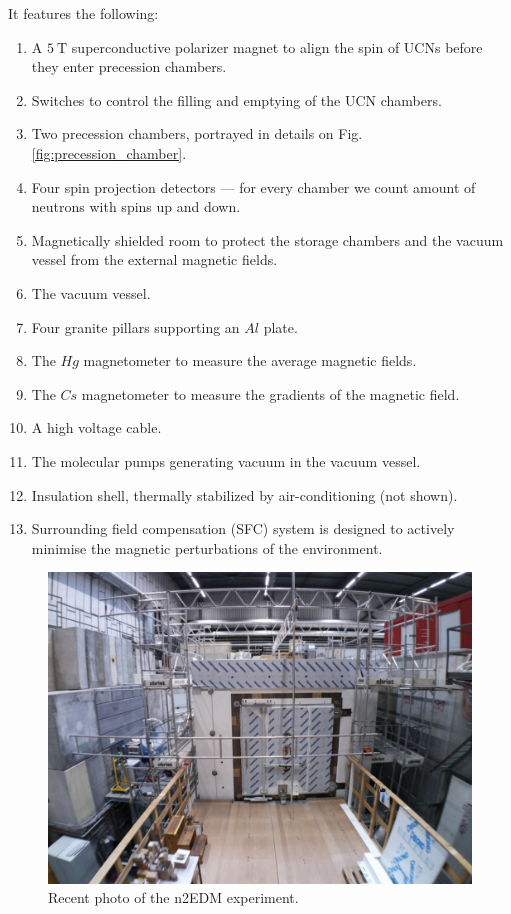 It features \cite{Abel2018} the following:
\begin{enumerate}
	\item A $5\ \text{T}$ superconductive polarizer magnet to align the spin of UCNs before they enter precession chambers.
	\item Switches to control the filling and emptying of the UCN chambers.
	\item Two precession chambers, portrayed in details on Fig. \ref{fig:precession_chamber}.
	\item Four spin projection detectors --- for every chamber we count amount of neutrons with spins up and down.
	\item Magnetically shielded room to protect the storage chambers and the vacuum vessel from the external magnetic fields.
	\item The vacuum vessel.
	\item Four granite pillars supporting an $Al$ plate.
	\item The $Hg$ magnetometer to measure the average magnetic fields.
	\item The $Cs$ magnetometer to measure the gradients of the magnetic field.
	\item A high voltage cable.
	\item The molecular pumps generating vacuum in the vacuum vessel.
	\item Insulation shell, thermally stabilized by air-conditioning (not shown).
	\item Surrounding field compensation (SFC) system is designed to actively minimise the magnetic perturbations of the environment.
\end{enumerate}

\begin{figure}[h]
	\centering
	\includegraphics[width=.79\textwidth]{img/n2edm_photo}
	\caption{Recent photo of the n2EDM experiment.}
	\label{fig:n2edm_photo}
\end{figure}%